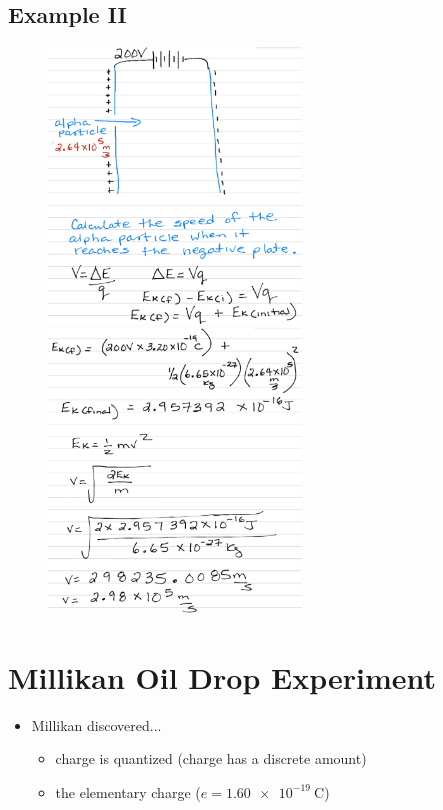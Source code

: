 \documentclass[a4paper,12pt]{article}
\begin{document}
\subsection{Example II}
\begin{figure}[H]
    \centering
    \includegraphics[width=0.60\textwidth]{voltspeed1}
    \includegraphics[width=0.60\textwidth]{voltspeed2}
\end{figure}

\section{Millikan Oil Drop Experiment}
\begin{itemize}
    \item{
        Millikan discovered...
        \begin{itemize}
            \item{charge is quantized (charge has a discrete amount)}
            \item{the elementary charge ($e = \SI{1.60e-19}{\coulomb}$)}
        \end{itemize}
    }
\end{itemize}
\end{document}
